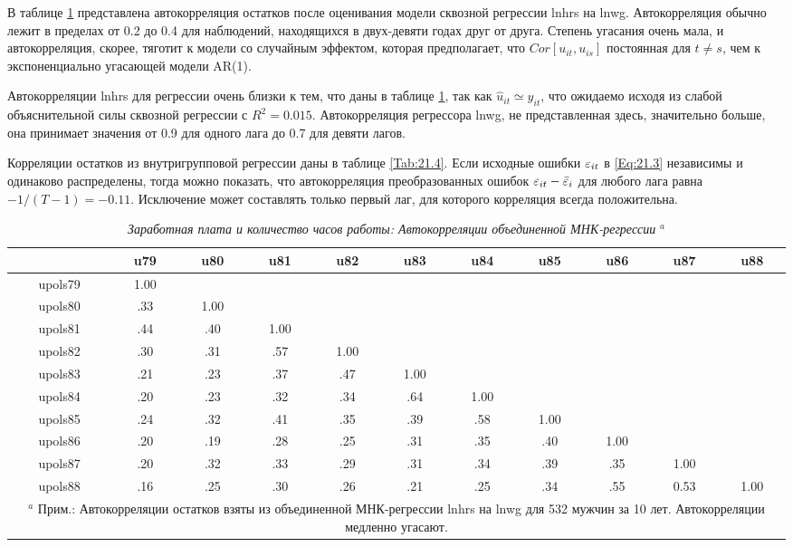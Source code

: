 В таблице \ref{Tab:21.3} представлена автокорреляция остатков после оценивания модели сквозной регрессии lnhrs на lnwg. Автокорреляция обычно лежит в пределах от 0.2 до 0.4 для наблюдений, находящихся в двух-девяти годах друг от друга. Степень угасания очень мала, и автокорреляция, скорее, тяготит к модели со случайным эффектом, которая предполагает, что $Cor[u_{it}, u_{is}]$  постоянная для $t \neq s$, чем к экспоненциально угасающей модели AR(1).

Автокорреляции lnhrs для регрессии очень близки к тем, что даны в таблице \ref{Tab:21.3}, так как $\hat{u}_{it} \simeq y_{it}$, что ожидаемо исходя из слабой объяснительной силы сквозной регрессии с $R^2=0.015$. Автокорреляция регрессора lnwg, не представленная здесь, значительно больше, она принимает значения от 0.9 для одного лага до 0.7 для девяти лагов.

Корреляции остатков из внутригрупповой регрессии даны в таблице \ref{Tab:21.4}. Если исходные ошибки $\varepsilon_{it}$ в \ref{Eq:21.3} независимы и одинаково распределены, тогда можно показать, что автокорреляция преобразованных ошибок $\varepsilon_{it}-\bar{\varepsilon}_i$ для любого лага равна $-1/(T-1)=-0.11$. Исключение может составлять только первый лаг, для которого корреляция всегда положительна.


\begin{table}[ht]
\caption{{\it Заработная плата и количество часов работы: Автокорреляции объединенной МНК-регрессии} ${}^a$} 
\centering
\begin{tabular}{ccccccccccc}
\hline \hline
	&	\textbf{u79} & \textbf{u80} & \textbf{u81} & \textbf{u82} & \textbf{u83} & \textbf{u84} & \textbf{u85} & \textbf{u86} & \textbf{u87} & \textbf{u88}  \\
\hline
upols79 & 1.00 & & & & & & & & & \\
upols80 & .33 	& 1.00 & & & & & & & & \\
upols81 & .44	& .40 & 1.00 & & & & & & & \\
upols82 & .30	& .31 & .57 & 1.00 & & & & & & \\
upols83 & .21	& .23 & .37 & .47 & 1.00 & & & & & \\
upols84 & .20	& .23 & .32 & .34 & .64 & 1.00 & & & & \\
upols85 & .24	& .32 & .41 & .35 & .39 & .58 & 1.00 & & & \\
upols86 & .20	& .19 & .28 & .25 & .31 & .35 & .40 & 1.00 & & \\
upols87 & .20	& .32 & .33 & .29 & .31 & .34 & .39 & .35 & 1.00 & \\
upols88 & .16	& .25 & .30 & .26 & .21 & .25 & .34 & .55 & 0.53 &  1.00\\
\hline \hline
\multicolumn{11}{p{15cm}}{${}^a$ Прим.: Автокорреляции остатков взяты из объединенной МНК-регрессии lnhrs на lnwg для 532 мужчин за 10 лет. Автокорреляции медленно угасают.}
\end{tabular}
\label{Tab:21.3}
\end{table}

